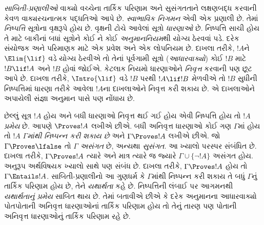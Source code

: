 \emph{સાબિતી-પ્રણાલીઓ} વાક્યો વચ્ચેના તાર્કિક પરિણામ અને સુસંગતતાને
લક્ષણબદ્ધ કરવાની કેવળ વાક્યરચનાત્મક પદ્ધતિઓ આપે છે. \emph{સ્વાભાવિક નિગમન}
એવી એક પ્રણાલી છે. તેમાં \emph{નિષ્પત્તિ} સૂત્રોના વૃક્ષરૂપે હોય છે.
વૃક્ષની ટોચે આવેલાં સૂત્રો \emph{ધારણાઓ} છે. નિષ્પત્તિ સાચી હોય તે માટે
બાકીનાં બધાં સૂત્રોને કોઈ ને કોઈ \emph{અનુમાનનિયમ}થી યોગ્ય ઠેરવવાં પડે.
દરેક સંયોજક અને પરિમાણક માટે એક પ્રવેશ અને એક લોપનિયમ છે. દાખલા તરીકે,
$!A$ને $\Elim{\lif}$ વડે યોગ્ય ઠેરવીએ તો તેનાં પૂર્વગામી સૂત્રો
(\emph{આધારવાક્યો}) કોઈ $!B$ માટે $!B \lif !A$ અને $!B$ હોવાં જોઈએ.
કેટલાક નિયમો ધારણાઓને \emph{નિવૃત્ત} કરવાની પણ છૂટ આપે છે. દાખલા તરીકે,
$\Intro{\lif}$ વડે $!B$ પરથી $!A \lif !B$ મેળવીએ તો $!B$ સુધીની
નિષ્પત્તિમાં ધારણા તરીકે આવેલા $!A$ના દાખલાઓને નિવૃત્ત કરી શકાય છે. એ
દાખલાઓને અપાયેલી સંજ્ઞા અનુમાન પાસે પણ નોંધાય છે.

છેલ્લું સૂત્ર $!A$ હોય અને બધી ધારણાઓ નિવૃત્ત થઈ ગઈ હોય એવી નિષ્પત્તિ
હોય તો $!A$ \emph{પ્રમેય} છે. આપણે $\Proves !A$ લખીએ છીએ. બધી અનિવૃત્ત
ધારણાઓ કોઈ ગણ $\Gamma$માં હોય તો $!A$ \emph{$\Gamma$માંથી નિષ્પન્ન કરી
શકાય છે} અને $\Gamma \Proves !A$ લખીએ છીએ. જો $\Gamma \Proves \lfalse$
તો $\Gamma$ \emph{અસંગત} છે, અન્યથા \emph{સુસંગત}. આ ખ્યાલો પરસ્પર
સંબંધિત છે. દાખલા તરીકે, $\Gamma \Proves !A$ ત્યારે અને માત્ર ત્યારે જ
જ્યારે $\Gamma \cup \{\lnot !A\}$ અસંગત હોય. અનુરૂપ અર્થવિષયક ખ્યાલો સાથે
પણ સંબંધ છે. દાખલા તરીકે, $\Gamma \Proves !A$ હોય તો $\Gamma \Entails !A$.
સાબિતી-પ્રણાલીનો આ ગુણધર્મ કે $\Gamma$માંથી નિષ્પન્ન કરી શકાય તે બધું
$\Gamma$નું તાર્કિક પરિણામ હોય છે, તેને \emph{યથાર્થતા} કહે છે. નિષ્પત્તિની
લંબાઈ પર આગમનથી \emph{યથાર્થતાનું પ્રમેય} સાબિત થાય છે. તેમાં બતાવીએ છીએ
કે દરેક અનુમાનના આધારવાક્યો પોતપોતાની અનિવૃત્ત ધારણાઓનાં તાર્કિક પરિણામ હોય
તો તેનું તારણ પણ પોતાની અનિવૃત્ત ધારણાઓનું તાર્કિક પરિણામ રહે છે.
